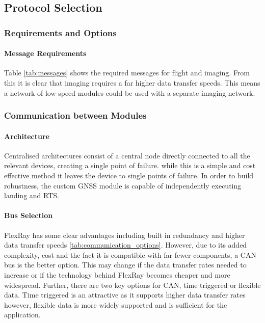 \subsection{Protocol Selection}\label{sub_section:tgt_protocol_selection}

\subsubsection{Requirements and Options}\label{sub_sub_section:tgt_requirements}
\paragraph{Message Requirements}
Table \ref{tab:messages} shows the required messages for flight and imaging. From this it is clear that imaging requires a far higher data transfer speeds. This means a network of low speed modules could be used with a separate imaging network.



\subsubsection{Communication between Modules}\label{sub_sub_section:tgt_comms_modules}
\paragraph{Architecture}
Centralised architectures consist of a central node directly connected to all the relevant devices, creating a single point of failure. while this is a simple and cost effective method it leaves the device to single points of failure. In order to build robustness, the custom \gls{GNSS} module is capable of independently executing landing and \gls{RTS}.  
\paragraph{Bus Selection}
FlexRay has some clear advantages including built in redundancy and higher data transfer speeds \ref{tab:communication_options}. However, due to its added complexity, cost and the fact it is compatible with far fewer components, a \gls{CAN} bus is the better option. This may change if the data transfer rates needed to increase or if the technology behind FlexRay becomes cheaper and more widespread. Further, there are two key options for \gls{CAN}, time triggered or flexible data. Time triggered is an attractive as it supports higher data transfer rates however, flexible data is more widely supported and is sufficient for the application.\cite{CANFlexRay}
 
